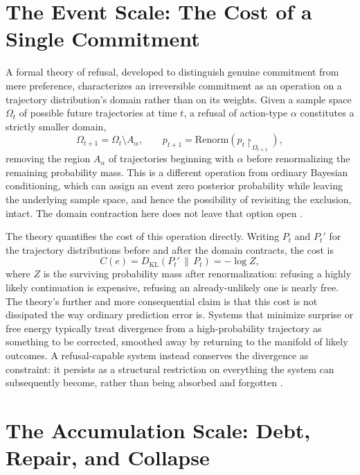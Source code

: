 \documentclass[11pt]{article}
\theoremstyle{plain}
\begin{document}
\section{The Event Scale: The Cost of a Single Commitment}
\label{sec:event}

A formal theory of refusal, developed to distinguish genuine commitment from mere preference, characterizes an irreversible commitment as an operation on a trajectory distribution's domain rather than on its weights. Given a sample space $\Omega_t$ of possible future trajectories at time $t$, a refusal of action-type $\alpha$ constitutes a strictly smaller domain,
\[
\Omega_{t+1} = \Omega_t \setminus A_\alpha, \qquad p_{t+1} = \mathrm{Renorm}\left(p_t \restriction_{\Omega_{t+1}}\right),
\]
removing the region $A_\alpha$ of trajectories beginning with $\alpha$ before renormalizing the remaining probability mass. This is a different operation from ordinary Bayesian conditioning, which can assign an event zero posterior probability while leaving the underlying sample space, and hence the possibility of revisiting the exclusion, intact. The domain contraction here does not leave that option open \citep{throwingthegame}.

The theory quantifies the cost of this operation directly. Writing $P_t$ and $P_t'$ for the trajectory distributions before and after the domain contracts, the cost is
\[
C(e) = D_{\mathrm{KL}}(P_t' \,\|\, P_t) = -\log Z,
\]
where $Z$ is the surviving probability mass after renormalization: refusing a highly likely continuation is expensive, refusing an already-unlikely one is nearly free. The theory's further and more consequential claim is that this cost is not dissipated the way ordinary prediction error is. Systems that minimize surprise or free energy typically treat divergence from a high-probability trajectory as something to be corrected, smoothed away by returning to the manifold of likely outcomes. A refusal-capable system instead conserves the divergence as constraint: it persists as a structural restriction on everything the system can subsequently become, rather than being absorbed and forgotten \citep{throwingthegame}.

\section{The Accumulation Scale: Debt, Repair, and Collapse}
\label{sec:accumulation}
\end{document}
